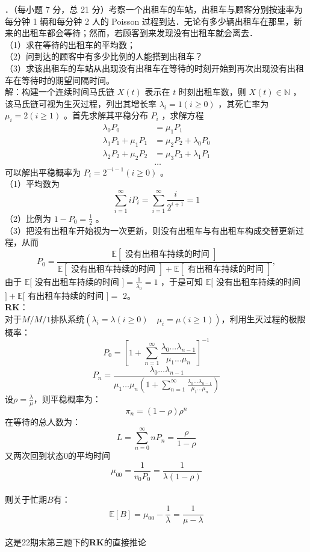 \documentclass[UTF8,openany]{book}
\begin{document}
．（每小题 7 分，总 21 分）考察一个出租车的车站，出租车与顾客分别按速率为每分钟 1 辆和每分钟 2 人的 Poisson 过程到达．无论有多少辆出租车在那里，新来的出租车都会等待；然而，若顾客到来发现没有出租车就会离去．\\
（1）求在等待的出租车的平均数；\\
（2）问到达的顾客中有多少比例的人能搭到出租车？\\
（3）求该出租车的车站从出现没有出租车在等待的时刻开始到再次出现没有出租车在等待时的期望间隔时间。\\
解：构建一个连续时间马氏链 $X(t)$ 表示在 $t$ 时刻出租车数，则 $X(t) \in \mathbb{N}$ ，该马氏链可视为生灭过程，列出其增长率 $\lambda_i=1(i \geq 0)$ ，其死亡率为 $\mu_i=2(i \geq 1)$ 。首先求解其平稳分布 $P_i$ ，求解方程\\
$$
\begin{aligned}
	\lambda_0 P_0 & =\mu_1 P_1 \\
	\lambda_1 P_1+\mu_1 P_1 & =\mu_2 P_2+\lambda_0 P_0 \\
	\lambda_2 P_2+\mu_2 P_2 & =\mu_3 P_3+\lambda_1 P_1 \\
	& \ldots
\end{aligned}
$$
可以解出平稳概率为 $P_i=2^{-i-1}(i \geq 0)$ 。\\
（1）平均数为
$$
\sum_{i=1}^{\infty} i P_i=\sum_{i=1}^{\infty} \frac{i}{2^{i+1}}=1
$$
（2）比例为 $1-P_0=\frac{1}{2}$ 。\\
（3）把没有出租车开始视为一次更新，则没有出租车与有出租车构成交替更新过程，从而
$$
P_0=\frac{\mathbb{E}[\text { 没有出租车持续的时间 }]}{\mathbb{E}[\text { 没有出租车持续的时间 }]+\mathbb{E}[\text { 有出租车持续的时间 }]},
$$
由于 $\mathbb{E}[$ 没有出租车持续的时间 $]=\frac{1}{\lambda_0}=1$ ，于是可知 $\mathbb{E}[$ 没有出租车持续的时间 $]+\mathbb{E}[$ 有出租车持续的时间 $]=$ 2。\\
\textbf{RK}：\\
对于$M/ M / 1$排队系统$(\lambda_i=\lambda(i \geq 0)\quad \mu_i=\mu(i \geq 1))$，利用生灭过程的极限概率：
\[
P_0=\left[1+\sum\limits_{n=1}^{\infty} \frac{\lambda_0 \dots \lambda_{n-1}}{\mu_1 \dots \mu_n} \right] ^{-1}
\]
\[
P_n=\frac{\lambda_0 \dots \lambda_{n-1}}{\mu_1 \dots \mu_n\left(1+\sum\limits_{n=1}^{\infty} \frac{\lambda_0 \dots \lambda_{n-1}}{\mu_1 \dots \mu_n} \right) }
\]
设$\rho=\frac{\lambda}{\mu}$，则平稳概率为：
\[
\pi_n=(1-\rho)\rho^n
\]
在等待的总人数为：
\[
L=\sum\limits_{n=0}^{\infty} nP_n=\frac{\rho}{1-\rho}
\]
又两次回到状态0的平均时间$$\mu_{00}=\frac{1}{v_0P_0}=\frac{1}{\lambda(1-\rho)}$$\\
则关于忙期$B$有：
\[
\mathbb{E}[B]=\mu_{00}-\frac{1}{\lambda}=\frac{1}{\mu-\lambda}
\]\\
这是22期末第三题下的\textbf{RK}的直接推论\\
\end{document}
